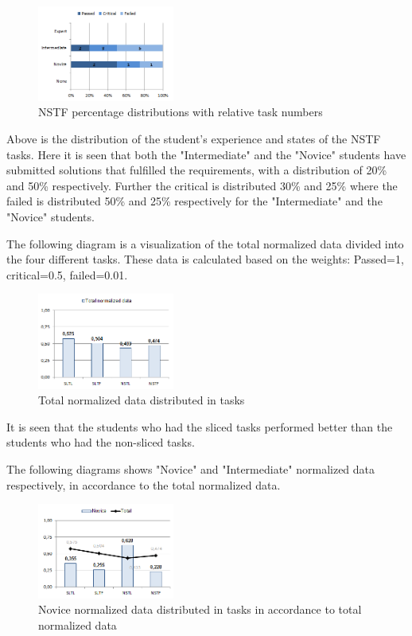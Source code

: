 \documentclass{sig-alternate-05-2015}
\begin{document}
\begin{figure}[H]
	\centering
	\includegraphics[width=0.4\textwidth]{img09}
	\caption{NSTF percentage distributions with relative task numbers}
\end{figure}

Above is the distribution of the student's experience and states of the NSTF tasks. Here it is seen that both the "Intermediate" and the "Novice" students have submitted solutions that fulfilled the requirements, with a distribution of 20\% and 50\% respectively. Further the critical is distributed 30\% and 25\% where the failed is distributed 50\% and 25\% respectively for the "Intermediate" and the "Novice" students.

The following diagram is a visualization of the total normalized data divided into the four different tasks. These data is calculated based on the weights: Passed=1, critical=0.5, failed=0.01.

\begin{figure}[H]
	\centering
	\includegraphics[width=0.4\textwidth]{img10}
	\caption{Total normalized data distributed in tasks}
\end{figure}

It is seen that the students who had the sliced tasks performed better than the students who had the non-sliced tasks.

The following diagrams shows "Novice" and "Intermediate" normalized data respectively, in accordance to the total normalized data.

\begin{figure}[H]
	\centering
	\includegraphics[width=0.4\textwidth]{img11}
	\caption{Novice normalized data distributed in tasks in accordance to total normalized data}
\end{figure}
\end{document}
